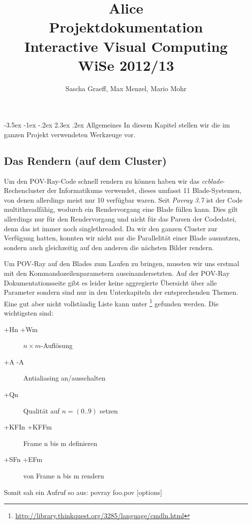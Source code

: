 \documentclass[twocolumn]{article}
\author{Sascha Graeff, Max Menzel, Mario Mohr}
\title{Alice \\ \small Projektdokumentation \\ Interactive Visual Computing \\ WiSe 2012/13}
\makeatletter
\renewcommand\section{\@startsection{section}{1}{\z@}%
                                      {-3.5ex \@plus -1ex \@minus -.2ex}%
                                      {2.3ex \@plus.2ex}%
                                      {\normalfont\large\bfseries}}
\makeatother
\begin{document}
\maketitle


\tableofcontents

\section{Allgemeines}
In diesem Kapitel stellen wir die im ganzen Projekt verwendeten Werkzeuge vor.

\subsection{Das Rendern (auf dem Cluster)} %
Um den POV-Ray-Code schnell rendern zu können haben wir das \textit{ccblade}-Rechencluster der Informatikums verwendet, dieses umfasst 11 Blade-Systemen, von denen allerdings meist nur 10 verfügbar waren.
Seit \textit{Povray 3.7} ist der Code multithreadfähig, wodurch ein Rendervorgang eine Blade füllen kann. Dies gilt allerdings nur für den Rendervorgang und nicht für das Parsen der Codedatei, denn das ist immer noch singlethreaded.
Da wir den ganzen Cluster zur Verfügung hatten, konnten wir nicht nur die Parallelität einer Blade ausnutzen, sondern auch gleichzeitig auf den anderen die nächsten Bilder rendern. 

Um POV-Ray auf den Blades zum Laufen zu bringen, mussten wir uns erstmal mit den Kommandozeilenparametern auseinandersetzten. Auf der POV-Ray Dokumentationsseite gibt es leider keine aggregierte Übersicht über alle Parameter sondern sind nur in den Unterkapiteln der entsprechenden Themen. Eine gut aber nicht vollständig Liste kann unter \footnote{\label{foot:cmdLink}\url{http://library.thinkquest.org/3285/language/cmdln.html}} gefunden werden. Die wichtigsten sind:
\begin{description}
\item[+Hn +Wm] $n\times{}m$-Auflösung
\item[+A -A]Antialiasing an/ausschalten
\item[+Qn] Qualität auf $n = (0 .. 9)$ setzen
\item[+KFIn +KFFm] Frame n bis m definieren
\item[+SFn +EFm] von Frame n bis m rendern 
\end{description}
Somit sah ein Aufruf so aus:  povray foo.pov  [options]
\end{document}
